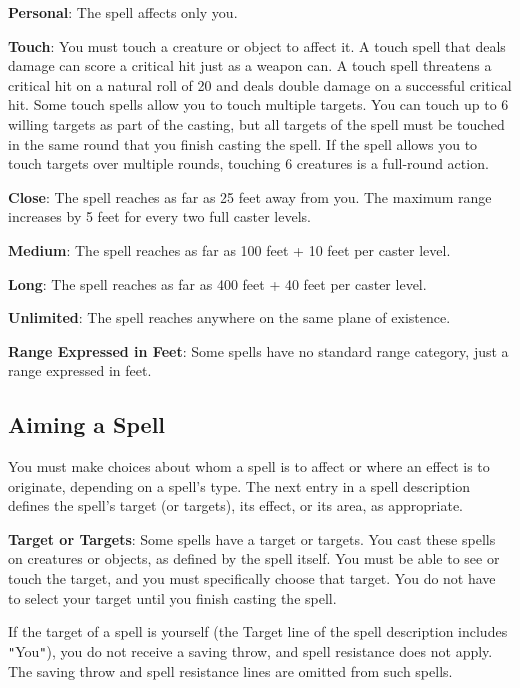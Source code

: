 \textbf{Personal}: The spell affects only you.
				
\textbf{Touch}: You must touch a creature or object to affect it. A touch spell that deals damage can score a critical hit just as a weapon can. A touch spell threatens a critical hit on a natural roll of 20 and deals double damage on a successful critical hit. Some touch spells allow you to touch multiple targets. You can touch up to 6 willing targets as part of the casting, but all targets of the spell must be touched in the same round that you finish casting the spell. If the spell allows you to touch targets over multiple rounds, touching 6 creatures is a full-round action.
				
\textbf{Close}: The spell reaches as far as 25 feet away from you. The maximum range increases by 5 feet for every two full caster levels.
				
\textbf{Medium}: The spell reaches as far as 100 feet + 10 feet per caster level.
				
\textbf{Long}: The spell reaches as far as 400 feet + 40 feet per caster level.
				
\textbf{Unlimited}: The spell reaches anywhere on the same plane of existence.
				
\textbf{Range Expressed in Feet}: Some spells have no standard range category, just a range expressed in feet.
				
\subsection{Aiming a Spell}

				
You must make choices about whom a spell is to affect or where an effect is to originate, depending on a spell's type. The next entry in a spell description defines the spell's target (or targets), its effect, or its area, as appropriate.
				
\textbf{Target or Targets}: Some spells have a target or targets. You cast these spells on creatures or objects, as defined by the spell itself. You must be able to see or touch the target, and you must specifically choose that target. You do not have to select your target until you finish casting the spell.
				
If the target of a spell is yourself (the Target line of the spell description includes \texttt{{}"{}}You\texttt{{}"{}}), you do not receive a saving throw, and spell resistance does not apply. The saving throw and spell resistance lines are omitted from such spells.
				
